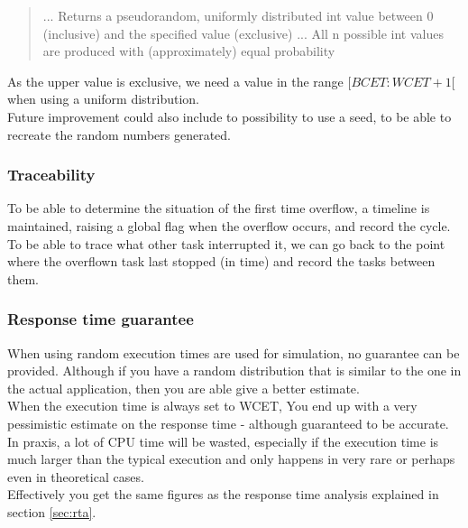 \documentclass{acm_proc_article-sp}
\begin{document}
\begin{quotation}
... Returns a pseudorandom, uniformly distributed int value between 0 (inclusive) and the specified value (exclusive) ... All n possible int values are produced with (approximately) equal probability\cite{javadoc16}
\end{quotation}

As the upper value is exclusive, we need a value in the range $[BCET:WCET+1[$ when using a uniform distribution.\\
Future improvement could also include to possibility to use a seed, to be able to recreate the random numbers generated.

\subsubsection{Traceability}
To be able to determine the situation of the first time overflow, a timeline is maintained, raising a global flag when the overflow occurs, and record the cycle.\\
To be able to trace what other task interrupted it, we can go back to the point where the overflown task last stopped (in time) and record the tasks between them.

\subsubsection{Response time guarantee}
When using random execution times are used for simulation, no guarantee can be provided. Although if you have a random distribution that is similar to the one in the actual application, then you are able give a better estimate.\\

When the execution time is always set to WCET, You end up with a very pessimistic estimate on the response time - although guaranteed to be accurate. In praxis, a lot of CPU time will be wasted, especially if the execution time is much larger than the typical execution and only happens in very rare or perhaps even in theoretical cases.\\
Effectively you get the same figures as the response time analysis explained in section \ref{sec:rta}.
\end{document}

